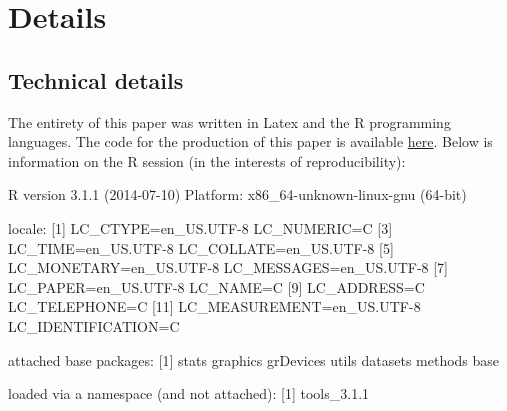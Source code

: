\clearpage
\section*{Details}

\subsection*{Technical details} The entirety of this paper was written in Latex and the R programming languages.  The code for the production of this paper is available \href{https://github.com/joebrew/uf}{here}.  Below is information on the R session (in the interests of reproducibility):
\begin{Schunk}
\begin{Soutput}
R version 3.1.1 (2014-07-10)
Platform: x86_64-unknown-linux-gnu (64-bit)

locale:
 [1] LC_CTYPE=en_US.UTF-8       LC_NUMERIC=C              
 [3] LC_TIME=en_US.UTF-8        LC_COLLATE=en_US.UTF-8    
 [5] LC_MONETARY=en_US.UTF-8    LC_MESSAGES=en_US.UTF-8   
 [7] LC_PAPER=en_US.UTF-8       LC_NAME=C                 
 [9] LC_ADDRESS=C               LC_TELEPHONE=C            
[11] LC_MEASUREMENT=en_US.UTF-8 LC_IDENTIFICATION=C       

attached base packages:
[1] stats     graphics  grDevices utils     datasets  methods   base     

loaded via a namespace (and not attached):
[1] tools_3.1.1
\end{Soutput}
\end{Schunk}



